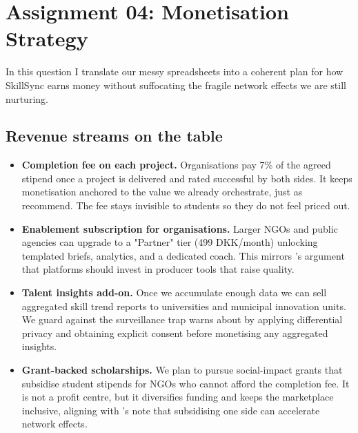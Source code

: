\section*{Assignment 04: Monetisation Strategy}

In this question I translate our messy spreadsheets into a coherent plan for how SkillSync earns money without suffocating the fragile network effects we are still nurturing.

\subsection*{Revenue streams on the table}
\begin{itemize}
  \item \textbf{Completion fee on each project.} Organisations pay 7\% of the agreed stipend once a project is delivered and rated successful by both sides. It keeps monetisation anchored to the value we already orchestrate, just as \citet{HagiuWright2013} recommend. The fee stays invisible to students so they do not feel priced out.
  \item \textbf{Enablement subscription for organisations.} Larger NGOs and public agencies can upgrade to a "Partner" tier (499 DKK/month) unlocking templated briefs, analytics, and a dedicated coach. This mirrors \citet{Choudary2016}'s argument that platforms should invest in producer tools that raise quality.
  \item \textbf{Talent insights add-on.} Once we accumulate enough data we can sell aggregated skill trend reports to universities and municipal innovation units. We guard against the surveillance trap \citet{Zuboff2019} warns about by applying differential privacy and obtaining explicit consent before monetising any aggregated insights.
  \item \textbf{Grant-backed scholarships.} We plan to pursue social-impact grants that subsidise student stipends for NGOs who cannot afford the completion fee. It is not a profit centre, but it diversifies funding and keeps the marketplace inclusive, aligning with \citet{ShapiroVarian1999}'s note that subsidising one side can accelerate network effects.
\end{itemize}

